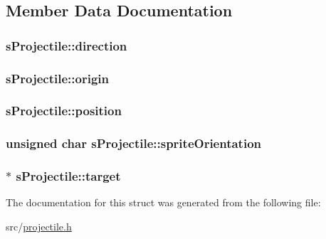 \subsection{Member Data Documentation}
\hypertarget{structs_projectile_a1bb47c3b0ac3cbe0230b2bb12b5c37fe}{
\subsubsection[{direction}]{ s\-Projectile\-::direction}}\label{structs_projectile_a1bb47c3b0ac3cbe0230b2bb12b5c37fe}
\hypertarget{structs_projectile_ae5186a452bdc7b1b3a712347792e10bc}{
\subsubsection[{origin}]{ s\-Projectile\-::origin}}\label{structs_projectile_ae5186a452bdc7b1b3a712347792e10bc}
\hypertarget{structs_projectile_a17ae15a48cf473955980cfe76227b617}{
\subsubsection[{position}]{ s\-Projectile\-::position}}\label{structs_projectile_a17ae15a48cf473955980cfe76227b617}
\hypertarget{structs_projectile_af4c8bfd3ea9e1b73ae510505ff9f1ae4}{
\subsubsection[{sprite\-Orientation}]{\setlength{\rightskip}{0pt plus 5cm}unsigned char s\-Projectile\-::sprite\-Orientation}}\label{structs_projectile_af4c8bfd3ea9e1b73ae510505ff9f1ae4}
\hypertarget{structs_projectile_a3b940e8b5370b3c328d2ed3d9924dc8d}{
\subsubsection[{target}]{$\ast$ s\-Projectile\-::target}}\label{structs_projectile_a3b940e8b5370b3c328d2ed3d9924dc8d}


The documentation for this struct was generated from the following file\-:\begin{DoxyCompactItemize}
\item 
src/\hyperlink{projectile_8h}{projectile.\-h}\end{DoxyCompactItemize}
